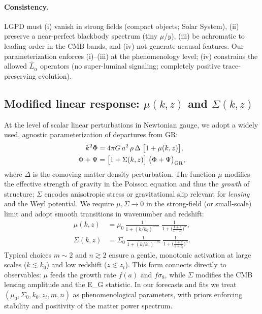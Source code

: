 \paragraph{Consistency.}
LGPD must (i) vanish in strong fields (compact objects; Solar System), (ii) preserve a near-perfect blackbody spectrum (tiny $\mu$/$y$), (iii) be achromatic to leading order in the CMB bands, and (iv) not generate acausal features. Our parameterization enforces (i)--(iii) at the phenomenology level; (iv) constrains the allowed $\hat{L}_\alpha$ operators (no super-luminal signaling; completely positive trace-preserving evolution).

\subsection{Modified linear response: $\mu(k,z)$ and $\Sigma(k,z)$}
At the level of scalar linear perturbations in Newtonian gauge, we adopt a widely used, agnostic parameterization of departures from GR:
\begin{align}
k^2 \Phi &= 4\pi G\,a^2\,\rho\,\Delta \;\big[1+\mu(k,z)\big], \label{eq:poisson}\\
\Phi + \Psi &= \big[1+\Sigma(k,z)\big]\;\big(\Phi+\Psi\big)_{\rm GR}, \label{eq:sigma}
\end{align}
where $\Delta$ is the comoving matter density perturbation. The function $\mu$ modifies the effective strength of gravity in the Poisson equation and thus the \emph{growth} of structure; $\Sigma$ encodes anisotropic stress or gravitational slip relevant for \emph{lensing} and the Weyl potential. We require $\mu,\Sigma\to 0$ in the strong-field (or small-scale) limit and adopt smooth transitions in wavenumber and redshift:
\begin{align}
\mu(k,z) &= \mu_0\, \frac{1}{1+(k/k_0)^{-m}} \; \frac{1}{1+\big(\frac{1+z}{1+z_t}\big)^{n}}, \label{eq:muform}\\
\Sigma(k,z) &= \Sigma_0\, \frac{1}{1+(k/k_0)^{-m}} \; \frac{1}{1+\big(\frac{1+z}{1+z_t}\big)^{n}}. \label{eq:sigmaform}
\end{align}
Typical choices $m\sim 2$ and $n\gtrsim 2$ ensure a gentle, monotonic activation at large scales ($k\lesssim k_0$) and low redshift ($z\lesssim z_t$). This form connects directly to observables: $\mu$ feeds the growth rate $f(a)$ and $f\sigma_8$, while $\Sigma$ modifies the CMB lensing amplitude and the E\_G statistic. In our forecasts and fits we treat $(\mu_0,\Sigma_0,k_0,z_t,m,n)$ as phenomenological parameters, with priors enforcing stability and positivity of the matter power spectrum.


